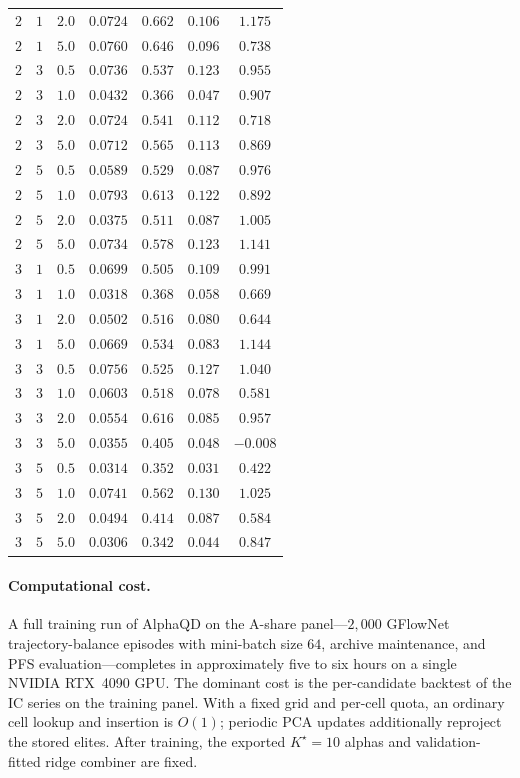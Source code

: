 \begin{table}[!htb]
\begin{tabular}{ccccccc}
$2$ & $1$ & $2.0$ & $0.0724$ & $0.662$ & $0.106$ & $1.175$ \\
$2$ & $1$ & $5.0$ & $0.0760$ & $0.646$ & $0.096$ & $0.738$ \\
$2$ & $3$ & $0.5$ & $0.0736$ & $0.537$ & $0.123$ & $0.955$ \\
$2$ & $3$ & $1.0$ & $0.0432$ & $0.366$ & $0.047$ & $0.907$ \\
$2$ & $3$ & $2.0$ & $0.0724$ & $0.541$ & $0.112$ & $0.718$ \\
$2$ & $3$ & $5.0$ & $0.0712$ & $0.565$ & $0.113$ & $0.869$ \\
$2$ & $5$ & $0.5$ & $0.0589$ & $0.529$ & $0.087$ & $0.976$ \\
$2$ & $5$ & $1.0$ & $0.0793$ & $0.613$ & $0.122$ & $0.892$ \\
$2$ & $5$ & $2.0$ & $0.0375$ & $0.511$ & $0.087$ & $1.005$ \\
$2$ & $5$ & $5.0$ & $0.0734$ & $0.578$ & $0.123$ & $1.141$ \\
\midrule
$3$ & $1$ & $0.5$ & $0.0699$ & $0.505$ & $0.109$ & $0.991$ \\
$3$ & $1$ & $1.0$ & $0.0318$ & $0.368$ & $0.058$ & $0.669$ \\
$3$ & $1$ & $2.0$ & $0.0502$ & $0.516$ & $0.080$ & $0.644$ \\
$3$ & $1$ & $5.0$ & $0.0669$ & $0.534$ & $0.083$ & $1.144$ \\
$3$ & $3$ & $0.5$ & $0.0756$ & $0.525$ & $0.127$ & $1.040$ \\
$3$ & $3$ & $1.0$ & $0.0603$ & $0.518$ & $0.078$ & $0.581$ \\
$3$ & $3$ & $2.0$ & $0.0554$ & $0.616$ & $0.085$ & $0.957$ \\
$3$ & $3$ & $5.0$ & $0.0355$ & $0.405$ & $0.048$ & $-0.008$ \\
$3$ & $5$ & $0.5$ & $0.0314$ & $0.352$ & $0.031$ & $0.422$ \\
$3$ & $5$ & $1.0$ & $0.0741$ & $0.562$ & $0.130$ & $1.025$ \\
$3$ & $5$ & $2.0$ & $0.0494$ & $0.414$ & $0.087$ & $0.584$ \\
$3$ & $5$ & $5.0$ & $0.0306$ & $0.342$ & $0.044$ & $0.847$ \\
\bottomrule
\end{tabular}
\end{table}

\paragraph{Computational cost.} A full training run of AlphaQD on the A-share panel---$2{,}000$ GFlowNet trajectory-balance episodes with mini-batch size $64$, archive maintenance, and PFS evaluation---completes in approximately five to six hours on a single NVIDIA RTX~4090 GPU. The dominant cost is the per-candidate backtest of the IC series on the training panel. With a fixed grid and per-cell quota, an ordinary cell lookup and insertion is $O(1)$; periodic PCA updates additionally reproject the stored elites. After training, the exported $K^\star=10$ alphas and validation-fitted ridge combiner are fixed.

